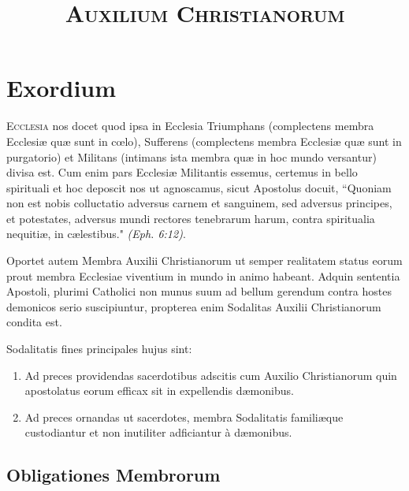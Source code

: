 \documentclass[9pt, twoside]{book}
\title{\textsc{Auxilium Christianorum}}
\author{}
\date{}
\begin{document}
\maketitle
\thispagestyle{empty}

\chapter{Exordium}
\thispagestyle{empty}

\vfill
\lettrine{E}{cclesia} nos docet quod ipsa in Ecclesia Triumphans (complectens membra Ecclesiæ quæ sunt in cœlo), Sufferens (complectens membra Ecclesiæ quæ sunt in purgatorio) et Militans (intimans ista membra quæ in hoc mundo versantur) divisa est. Cum enim pars Ecclesiæ Militantis essemus, certemus in bello spirituali et hoc deposcit nos ut agnoscamus, sicut Apostolus docuit, “Quoniam non est nobis colluctatio adversus carnem et sanguinem, sed adversus principes, et potestates, adversus mundi rectores tenebrarum harum, contra spiritualia nequitiæ, in cælestibus." \textit{(Eph. 6:12)}.\par
Oportet autem Membra Auxilii Christianorum ut semper realitatem status eorum prout membra Ecclesiae viventium in mundo in animo habeant. Adquin sententia Apostoli, plurimi Catholici non munus suum ad bellum gerendum contra hostes demonicos serio suscipiuntur, propterea enim Sodalitas Auxilii Christianorum condita est.

\clearpage

\noindent Sodalitatis fines principales hujus sint:
\begin{enumerate}
    \item Ad preces providendas sacerdotibus adscitis cum Auxilio Christianorum quin apostolatus eorum efficax sit in expellendis dæmonibus.
    \item Ad preces ornandas ut sacerdotes, membra Sodalitatis familiæque custodiantur et non inutiliter adficiantur à dæmonibus.
\end{enumerate}

\section{Obligationes Membrorum}
\end{document}
